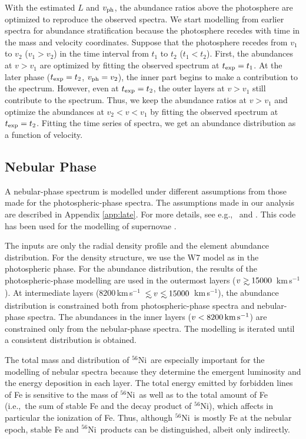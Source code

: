 \documentclass[usegraphicx,usenatbib]{mn2e}
\newcommand{\kms}{\mbox{\,km\,s$^{-1}$}}
\newcommand{\eg}{e.g.,\ }
\newcommand{\ie}{i.e.,\ }
\newcommand{\vph}{$v_{\rm ph}$}
\newcommand{\Nifs}{$^{56}$Ni}
\newcommand{\texp}{t_{\rm exp}}
\def\lsim{\mathrel{\rlap{\lower 4pt \hbox{\hskip 1pt $\sim$}}\raise 1pt\hbox {$<$}}}
\def\gsim{\mathrel{\rlap{\lower 4pt \hbox{\hskip 1pt $\sim$}}\raise 1pt\hbox {$>$}}}
\begin{document}
With the estimated $L$ and \vph, the abundance ratios above the photosphere are
optimized to reproduce the observed spectra. We start modelling from earlier
spectra for abundance stratification because the photosphere recedes with time
in the mass and velocity coordinates. Suppose that the photosphere recedes from
$v_1$ to $v_2$ ($v_1 > v_2$) in the time interval from $t_1$ to $t_2$ ($t_1 <
t_2$). First, the abundances at $v>v_1$ are optimized by fitting the observed
spectrum at $\texp=t_1$. At the later phase ($\texp=t_2$, $v_{\rm ph}=v_2$), 
the inner part begins to make a contribution to the spectrum. However, even at
$\texp=t_2$, the outer layers at $v>v_1$ still contribute to the spectrum. Thus,
we keep the abundance ratios at $v>v_1$ and optimize the abundances at $v_2 < v
< v_1$ by fitting the observed spectrum at $\texp=t_2$. Fitting the time series
of spectra, we get an abundance distribution as a function of velocity.


\subsection{Nebular Phase}

A nebular-phase spectrum is modelled under different assumptions from those made
for the photospheric-phase spectra. The assumptions made in our analysis are
described in Appendix \ref{app:late}. For more details, see \eg
\citet{axelrod80} and \citet{mazzali01}. This code has been used for the
modelling of supernovae \citep[\eg][]{mazzali01}.

The inputs are only the radial density profile and the element abundance
distribution. For the density structure, we use the W7 model as in the
photospheric phase. For the abundance distribution, the results of the
photospheric-phase modelling are used in the outermost layers ($v \gsim 15000$
\kms). At  intermediate layers ($8200$\kms\ $\lsim v \lsim 15000$ \kms), the
abundance distribution is constrained both from photospheric-phase spectra and
nebular-phase spectra. The abundances in the inner layers ($v < 8200 \kms$) are
constrained only from the nebular-phase spectra. The modelling is iterated until
a consistent distribution is obtained.

The total mass and distribution of \Nifs\ are especially important for the
modelling of nebular spectra because they determine the emergent luminosity and
the energy deposition in each layer. The total energy emitted by forbidden lines
of Fe is sensitive to the mass of \Nifs\ as well as to the total amount of Fe 
(\ie the sum of stable Fe and the decay product of \Nifs), which affects in
particular the ionization of Fe. Thus, although \Nifs\ is mostly Fe at the
nebular epoch, stable Fe and \Nifs\ products can be distinguished, albeit only
indirectly.
\end{document}

